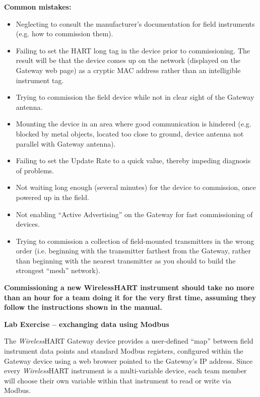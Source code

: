 \vskip 10pt

{\bf Common mistakes:}

\begin{itemize}
\item{} Neglecting to consult the manufacturer's documentation for field instruments (e.g. how to commission them).
\item{} Failing to set the HART long tag in the device prior to commissioning.  The result will be that the device comes up on the network (displayed on the Gateway web page) as a cryptic MAC address rather than an intelligible instrument tag.
\item{} Trying to commission the field device while not in clear sight of the Gateway antenna.
\item{} Mounting the device in an area where good communication is hindered (e.g. blocked by metal objects, located too close to ground, device antenna not parallel with Gateway antenna).
\item{} Failing to set the Update Rate to a quick value, thereby impeding diagnosis of problems.
\item{} Not waiting long enough (several minutes) for the device to commission, once powered up in the field.
\item{} Not enabling ``Active Advertising'' on the Gateway for fast commissioning of devices.
\item{} Trying to commission a collection of field-mounted transmitters in the wrong order (i.e. beginning with the transmitter farthest from the Gateway, rather than beginning with the nearest transmitter as you should to build the strongest ``mesh'' network).
\end{itemize}

\vskip 10pt

{\bf Commissioning a new WirelessHART instrument should take no more than an hour for a team doing it for the very first time, assuming they follow the instructions shown in the manual.}









\vfil \eject

\noindent
{\bf Lab Exercise -- exchanging data using Modbus}

\vskip 5pt

The {\sl Wireless}HART Gateway device provides a user-defined ``map'' between field instrument data points and standard Modbus registers, configured within the Gateway device using a web browser pointed to the Gateway's IP address.  Since every {\sl Wireless}HART instrument is a multi-variable device, each team member will choose their own variable within that instrument to read or write via Modbus.

